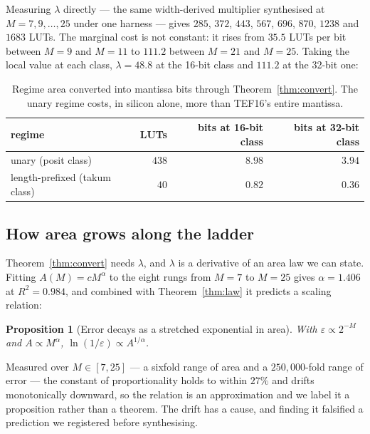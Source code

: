 \documentclass[11pt]{article}
\newtheorem{proposition}[theorem]{Proposition}
\theoremstyle{definition}
\begin{document}
Measuring $\lambda$ directly --- the same width-derived multiplier synthesised at
$M = 7, 9, \ldots, 25$ under one harness --- gives $285$, $372$, $443$, $567$,
$696$, $870$, $1238$ and $1683$ LUTs. The marginal cost is not constant: it rises
from $35.5$ LUTs per bit between $M{=}9$ and $M{=}11$ to $111.2$ between $M{=}21$
and $M{=}25$. Taking the local value at each class, $\lambda = 48.8$ at the
16-bit class and $111.2$ at the 32-bit one:

\begin{table}[t]\centering
\caption{Regime area converted into mantissa bits through
Theorem~\ref{thm:convert}. The unary regime costs, in silicon alone, more than
TEF16's entire mantissa.}
\label{tab:convert}
\begin{tabular}{lrrr}
\toprule
regime & LUTs & bits at 16-bit class & bits at 32-bit class \\
\midrule
unary (posit class)          & $438$ & $\mathbf{8.98}$ & $3.94$ \\
length-prefixed (takum class) & $40$  & $0.82$ & $0.36$ \\
\bottomrule
\end{tabular}
\end{table}


\subsection{How area grows along the ladder}\label{sec:arealaw}

Theorem~\ref{thm:convert} needs $\lambda$, and $\lambda$ is a derivative of an
area law we can state. Fitting $A(M) = cM^{\alpha}$ to the eight rungs from
$M{=}7$ to $M{=}25$ gives $\alpha = 1.406$ at $R^2 = 0.984$, and combined with
Theorem~\ref{thm:law} it predicts a scaling relation:

\begin{proposition}[Error decays as a stretched exponential in area]
\label{prop:stretched}
With $\varepsilon \propto 2^{-M}$ and $A \propto M^{\alpha}$,
$\ln(1/\varepsilon) \propto A^{1/\alpha}$.
\end{proposition}

Measured over $M \in [7,25]$ --- a sixfold range of area and a $250{,}000$-fold
range of error --- the constant of proportionality holds to within $27\%$ and
drifts monotonically downward, so the relation is an approximation and we label
it a proposition rather than a theorem. The drift has a cause, and finding it
falsified a prediction we registered before synthesising.
\end{document}
